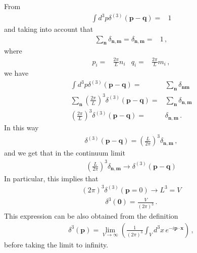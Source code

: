 From
\begin{align}
  \int d^3p \delta^{(3)}(\mathbf{p}-\mathbf{q})=&1
\end{align}
and taking into account that
\begin{align}
  \sum_{\mathbf{n}} \delta_{\mathbf{n}, \mathbf{m}}=\delta_{\mathbf{n}, \mathbf{m}}=&1\,,
\end{align}
where
\begin{align}
  p_i=&\frac{2\pi}{L}n_i & q_i=&\frac{2\pi}{L}m_i\,,
\end{align}
we have
\begin{align}
  \int d^3p \delta^{(3)}(\mathbf{p}-\mathbf{q})=&\sum_{\mathbf{n}} \delta_{\mathbf{n}\mathbf{m}}\nonumber\\
 \sum_{\mathbf{n}} \left(\frac{2\pi}{L}\right)^3\delta^{(3)}(\mathbf{p}-\mathbf{q})=&\sum_{\mathbf{n}} \delta_{\mathbf{n}, \mathbf{m}}\nonumber\\
  \left(\frac{2\pi}{L}\right)^3\delta^{(3)}(\mathbf{p}-\mathbf{q})=& \delta_{\mathbf{n}, \mathbf{m}}\,.
\end{align}
In this way
\begin{align}
  \delta^{(3)}(\mathbf{p}-\mathbf{q})=\left(\frac{L}{2\pi}\right)^3\delta_{\mathbf{n},\mathbf{m}}\,,
\end{align}
and we get that in the continuum limit
\begin{align}
  \label{eq:24}
\left(\frac{L}{2\pi}\right)^3\delta_{\mathbf{n},\mathbf{m}}\to  \delta^{(3)}(\mathbf{p}-\mathbf{q})
\end{align}
In particular, this implies that
\begin{align}
  \label{eq:25}
  (2\pi)^3\delta^{(3)}(\mathbf{p}=0)\to L^3=V
\end{align}
\begin{align}
\label{eq:26f}
  \delta^3(\mathbf{0})=\frac{V}{(2\pi)^3}\,.
\end{align}
This expression can be also obtained from the definition
\begin{align}
  \delta^3(\mathbf{p})=\lim_{V\to\infty}\left(\frac{1}{(2\pi)^3}\int_V d^3x\, e^{-i\mathbf{p}\cdot\mathbf{x} }\right)\,,
\end{align}
before taking the limit to infinity.



